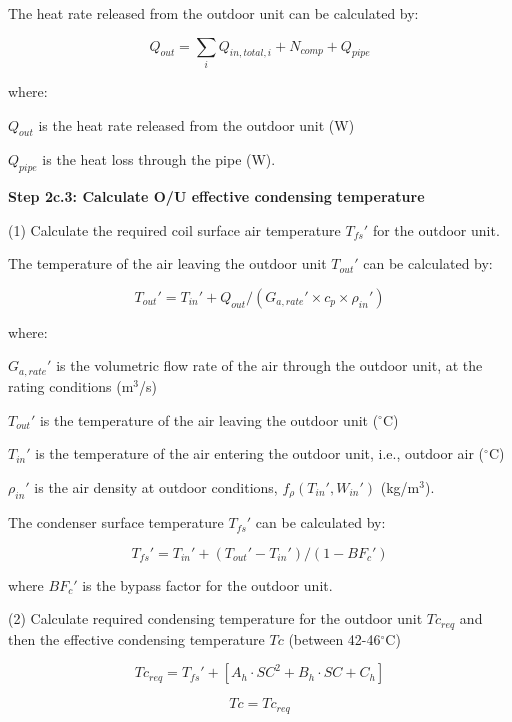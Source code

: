 The heat rate released from the outdoor unit can be calculated by:

\begin{equation}Q_{out}=\sum_iQ_{in,total,i}+N_{comp}+Q_{pipe}\end{equation}

where:

$Q_{out}$ is the heat rate released from the outdoor unit (W)

$Q_{pipe}$ is the heat loss through the pipe (W).

\textbf{Step 2c.3: Calculate O/U effective condensing temperature}

 (1) Calculate the required coil surface air temperature ${T_{fs}}'$ for the outdoor unit.

The temperature of the air leaving the outdoor unit ${T_{out}}'$ can be calculated by:

\begin{equation}{T_{out}}'={T_{in}}'+Q_{out}/({G_{a,rate}}'\times{c_p}\times{{\rho_{in}}'})\end{equation}

where:

${G_{a,rate}}'$ is the volumetric flow rate of the air through the outdoor unit, at the rating conditions (m\(^3\)/s)

${T_{out}}'$ is the temperature of the air leaving the outdoor unit (\(^{\circ}\)C)

${T_{in}}'$ is the temperature of the air entering the outdoor unit, i.e., outdoor air (\(^{\circ}\)C)

${\rho_{in}}'$ is the air density at outdoor conditions, $f_{\rho}({T_{in}}',{W_{in}}')$ (kg/m\(^3\)).

The condenser surface temperature ${T_{fs}}'$ can be calculated by:

\begin{equation}{T_{fs}}'={T_{in}}'+({T_{out}}'-{T_{in}}')/(1-{BF_c}')\end{equation}

where ${BF_c}'$ is the bypass factor for the outdoor unit.

(2) Calculate required condensing temperature for the outdoor unit $Tc_{req}$ and then the effective condensing temperature $Tc$ (between 42-46\(^{\circ}\)C)

\begin{equation}
Tc_{req}={T_{fs}}'+[A_h\cdot SC^2+B_h\cdot SC+C_h]
\end{equation}

\begin{equation}
Tc=Tc_{req}
\end{equation}

